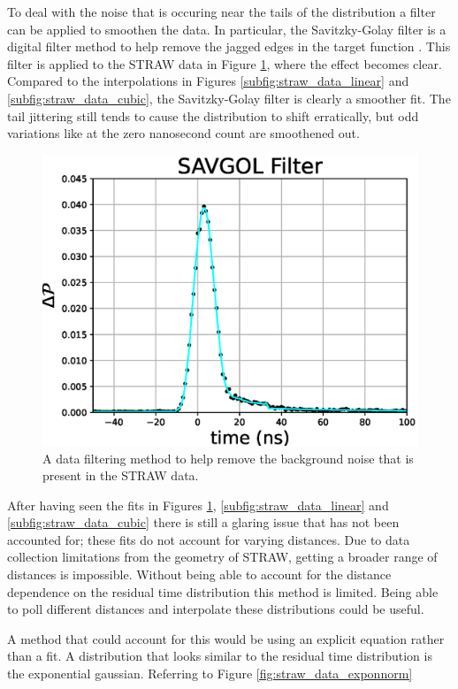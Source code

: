 To deal with the noise that is occuring near the tails of the distribution a filter can be applied to smoothen the data. In particular, the Savitzky-Golay filter is a digital filter method to help remove the jagged edges in the target function \cite{savgol}. This filter is applied to the STRAW data in Figure \ref{fig:straw_data_savgol}, where the effect becomes clear. Compared to the interpolations in Figures \ref{subfig:straw_data_linear} and \ref{subfig:straw_data_cubic}, the Savitzky-Golay filter is clearly a smoother fit. The tail jittering still tends to cause the distribution to shift erratically, but odd variations like at the zero nanosecond count are smoothened out.

\begin{figure}[H]
  \centering
  \includegraphics[width=12cm]{./Figures/reco_plots/straw_data_fit_savgol.eps}
  \caption{A data filtering method to help remove the background noise that is present in the STRAW data.}
  \label{fig:straw_data_savgol}
\end{figure}

After having seen the fits in Figures \ref{fig:straw_data_savgol}, \ref{subfig:straw_data_linear} and \ref{subfig:straw_data_cubic} there is still a glaring issue that has not been accounted for; these fits do not account for varying distances. Due to data collection limitations from the geometry of STRAW, getting a broader range of distances is impossible. Without being able to account for the distance dependence on the residual time distribution this method is limited. Being able to poll different distances and interpolate these distributions could be useful.

A method that could account for this would be using an explicit equation rather than a fit. A distribution that looks similar to the residual time distribution is the exponential gaussian. Referring to Figure \ref{fig:straw_data_exponnorm}

